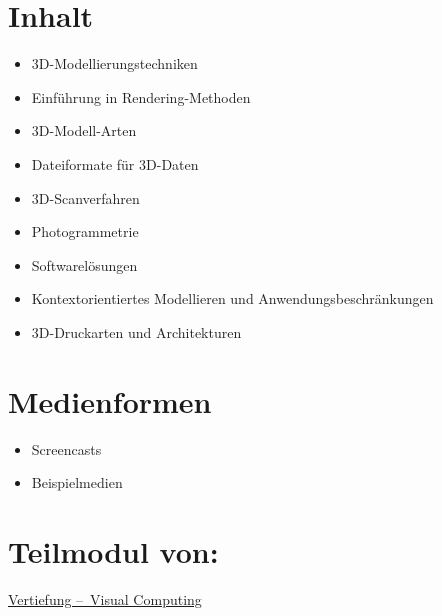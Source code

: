 \hypertarget{inhaltpathlabelmi-2017modulbeschreibungen-bachelorba_wpf-3d-msd}{%
\section*{Inhalt\label{/mi-2017/modulbeschreibungen-bachelor/BA_WPF-3D-MSD}}\label{inhaltpathlabelmi-2017modulbeschreibungen-bachelorba_wpf-3d-msd}}

\begin{itemize}
\tightlist
\item
  3D-Modellierungstechniken
\item
  Einführung in Rendering-Methoden
\item
  3D-Modell-Arten
\item
  Dateiformate für 3D-Daten
\item
  3D-Scanverfahren
\item
  Photogrammetrie
\item
  Softwarelösungen
\item
  Kontextorientiertes Modellieren und Anwendungsbeschränkungen
\item
  3D-Druckarten und Architekturen
\end{itemize}

\hypertarget{medienformenpathlabelmi-2017modulbeschreibungen-bachelorba_wpf-3d-msd}{%
\section*{Medienformen\label{/mi-2017/modulbeschreibungen-bachelor/BA_WPF-3D-MSD}}\label{medienformenpathlabelmi-2017modulbeschreibungen-bachelorba_wpf-3d-msd}}

\begin{itemize}
\tightlist
\item
  Screencasts
\item
  Beispielmedien
\end{itemize}

\hypertarget{teilmodul-vonpathlabelmi-2017modulbeschreibungen-bachelorba_wpf-3d-msd}{%
\section*{Teilmodul
von:\label{/mi-2017/modulbeschreibungen-bachelor/BA_WPF-3D-MSD}}\label{teilmodul-vonpathlabelmi-2017modulbeschreibungen-bachelorba_wpf-3d-msd}}

\hyperref[/mi-2017/modulbeschreibungen-bachelor/BA_Vertiefung-Visual-Computing]{Vertiefung – Visual Computing}

